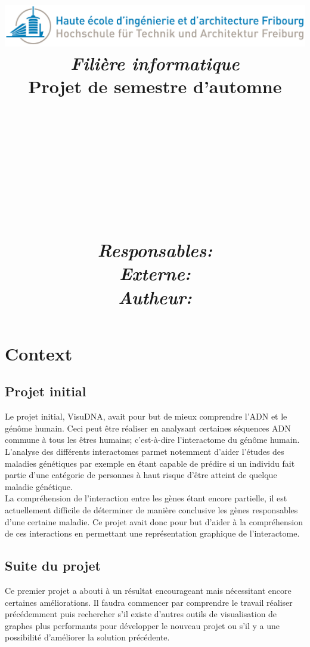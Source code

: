 \documentclass{article}
\title{
  \includegraphics[width=0.9\columnwidth]{Logo_HEIA}\\
  \vspace{1cm}
  \textmd{\textit{Filière informatique}} \\
  \vspace{2cm}
  \textmd{Projet de semestre d'automne}\\
  \textmd{\projDate}\\
  \vspace{1cm}
  \noindent\makebox[\linewidth]{\rule{\textwidth}{0.5pt}}\\
  \vspace{.5cm}
  \textmd{\textbf{\projName}}\\
  \textmd{\textbf{\docTitle}}\\
  \vspace{.5cm}\large
  \textmd{\textit{\docVersion}}\\
  \noindent\makebox[\linewidth]{\rule{\textwidth}{0.5pt}}\\
  \Large
  \vspace{3cm}
  \textit{Responsables:} \projSupervisors \\
  \vspace{1cm}
  \textit{Externe:} \projInitiator \\
  \vspace{1cm}
  \textit{Autheur:} \projAuthorName \\
  \author{}
}
\date{} %
\begin{document}
\maketitle


 \begingroup
 	\newpage
 	\renewcommand{\contentsname}{Table des matières}
 	\tableofcontents
 	\newpage
 \endgroup



\section{Context}
\subsection{Projet initial}
  Le projet initial, VisuDNA, avait pour but de mieux comprendre l'ADN et le génôme humain. Ceci peut être réaliser en analysant certaines séquences ADN commune à tous les êtres humains; c'est-à-dire l'interactome du génôme humain.  L'analyse des différents interactomes parmet notemment d'aider l'études des maladies génétiques par exemple en étant capable de prédire si un individu fait partie d'une catégorie de personnes à haut risque d'être atteint de quelque maladie génétique.
  \\
  La compréhension de l'interaction entre les gènes étant encore partielle, il est actuellement difficile de déterminer de manière conclusive les gènes responsables d'une certaine maladie. Ce projet avait donc pour but d'aider à la compréhension de ces interactions en permettant une représentation graphique de l'interactome.
\cite{Sisto:2014}

\subsection{Suite du projet}
  Ce premier projet a abouti à un résultat encourageant mais nécessitant encore certaines améliorations. Il faudra commencer par comprendre le travail réaliser précédemment puis rechercher s'il existe d'autres outils de visualisation de graphes plus performants pour développer le nouveau projet ou s'il y a une possibilité d'améliorer la solution précédente.
\end{document}
